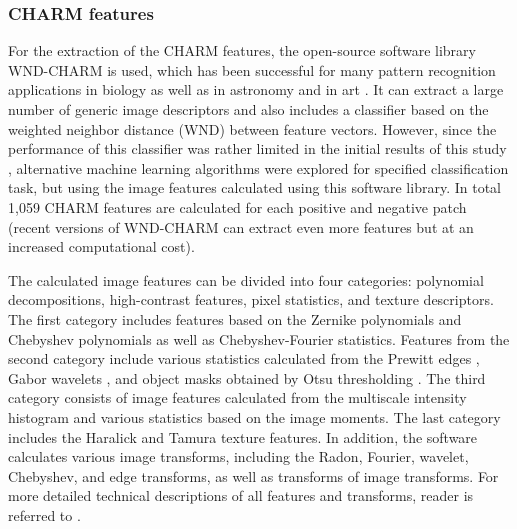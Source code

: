 \subsubsection{CHARM features}
\label{subsubsec:wnd-chrm}
For the extraction of the CHARM features, the open-source software library WND-CHARM \cite{shamir2008wndchrm, orlov2008wnd} is used, which has been successful for many pattern recognition applications in biology \cite{shamir2010pattern, uhlmann2016cp} as well as in astronomy \cite{shamir2012automatic, kuminski2014combining} and in art \cite{shamir2012computer}. It can extract a large number of generic image descriptors and also includes a classifier based on the weighted neighbor distance (WND) between feature vectors. However, since the performance of this classifier was rather limited in the initial results of this study \cite{mata2016automatic}, alternative machine learning algorithms were explored for specified classification task, but using the image features calculated using this software library. In total 1,059 CHARM features are calculated for each positive and negative patch (recent versions of WND-CHARM can extract even more features but at an increased computational cost).

The calculated image features can be divided into four categories: polynomial decompositions, high-contrast features, pixel statistics, and texture descriptors. The first category includes features based on the Zernike polynomials and Chebyshev polynomials \cite{gradshteyn2014table} as well as Chebyshev-Fourier statistics. Features from the second category include various statistics calculated from the Prewitt edges \cite{prewitt1970object}, Gabor wavelets \cite{gabor1946theory}, and object masks obtained by Otsu thresholding \cite{otsu1979threshold}. The third category consists of image features calculated from the multiscale intensity histogram \cite{hadjidemetriou2001spatial} and various statistics based on the image moments. The last category includes the Haralick \cite{haralick1973textural} and Tamura \cite{tamura1978textural} texture features. In addition, the software calculates various image transforms, including the Radon, Fourier, wavelet, Chebyshev, and edge transforms, as well as transforms of image transforms. For more detailed technical descriptions of all features and transforms, reader is referred to \cite{orlov2008wnd}.

